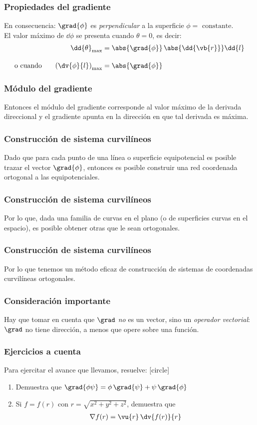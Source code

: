 \begin{frame}
\frametitle{Propiedades del gradiente}
En consecuencia: $\grad{\phi}$ es \emph{perpendicular} a la superficie $\phi = \mbox{ constante}$.
\\
\bigskip
\pause
El valor máximo de $\dd{\phi}$ se presenta cuando $\theta = 0$, es decir:
\begin{align*}
\dd{\theta}_{\max} &= \abs{\grad{\phi}} \, \abs{\dd{\vb{r}}} \dd{l} \\[1em]
\mbox{o cuando } \hspace{0.5cm} \left( \dv{\phi}{l} \right)_{\max} &= \abs{\grad{\phi}}
\end{align*}
\end{frame}
\begin{frame}
\frametitle{Módulo del gradiente}
Entonces el módulo del gradiente corresponde al valor máximo de la derivada direccional y el gradiente apunta en la dirección en que tal derivada es máxima.
\end{frame}
\begin{frame}
\frametitle{Construcción de sistema curvilíneos}
Dado que para cada punto de una línea o superficie equipotencial es posible trazar el vector $\grad{\phi}$, entonces es posible construir una red coordenada ortogonal a las equipotenciales.
\end{frame}
\begin{frame}
\frametitle{Construcción de sistema curvilíneos}
Por lo que, dada una familia de curvas en el plano (o de superficies curvas en el espacio), es posible obtener otras que le sean ortogonales.
\end{frame}
\begin{frame}
\frametitle{Construcción de sistema curvilíneos}
Por lo que tenemos un método eficaz de construcción de sistemas de coordenadas curvilíneas ortogonales.
\end{frame}
\begin{frame}
\frametitle{Consideración importante}
Hay que tomar en cuenta que $\grad$ \emph{no} es un vector, sino un \emph{operador vectorial}: $\grad$ no tiene dirección, a menos que opere sobre una función.
\end{frame}
\begin{frame}
\frametitle{Ejercicios a cuenta}
Para ejercitar el avance que llevamos, resuelve:
[circle]
\begin{enumerate}
\item Demuestra que $\grad{\phi \psi} = \phi \, \grad{\psi} + \psi \, \grad{\phi}$
\item Si $f = f(r)$ con $r = \sqrt{x^{2} + y^{2}+ z^{2}}$, demuestra que
\begin{align*}
\nabla{f(r)} = \vu{r} \, \dv{f(r)}{r}
\end{align*}
\end{enumerate}
\end{frame}
